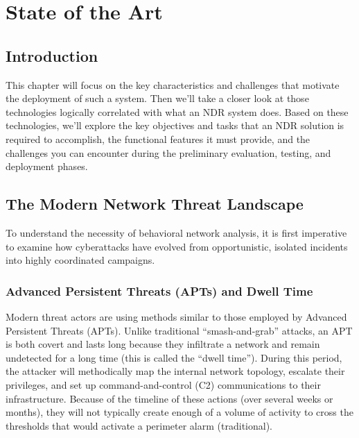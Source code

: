 \documentclass[12pt,a4paper]{report}
\begin{document}
\chapter{State of the Art}

\section{Introduction}

This chapter will focus on the key characteristics and challenges that motivate
the deployment of such a system. Then we’ll take a closer look at those technologies
logically correlated with what an NDR system does. Based on these technologies, we’ll
explore the key objectives and tasks that an NDR solution is required to accomplish, the
functional features it must provide, and the challenges you can encounter during the
preliminary evaluation, testing, and deployment phases.



\section{The Modern Network Threat Landscape}
To understand the necessity of behavioral network analysis, it is first imperative to examine how cyberattacks have evolved from opportunistic, isolated incidents into highly coordinated campaigns.

\subsection{Advanced Persistent Threats (APTs) and Dwell Time}
Modern threat actors are using methods similar to those employed by Advanced Persistent Threats (APTs). Unlike traditional ``smash-and-grab'' attacks, an APT is both covert and lasts long because they infiltrate a network and remain undetected for a long time (this is called the ``dwell time'')\cite{connectwise}. During this period, the attacker will methodically map the internal network topology, escalate their privileges, and set up command-and-control (C2) communications to their infrastructure. Because of the timeline of these actions (over several weeks or months), they will not typically create enough of a volume of activity to cross the thresholds that would activate a perimeter alarm (traditional).
\end{document}
